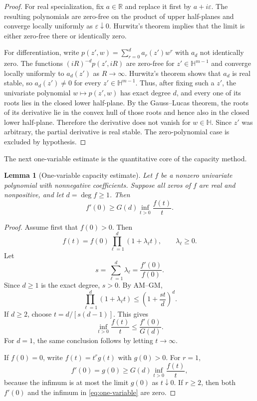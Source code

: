 \documentclass[11pt,a4paper]{article}
\numberwithin{equation}{section}
\newtheorem{lemma}[theorem]{Lemma}
\theoremstyle{definition}
\newcommand{\1}{\mathbf{1}}
\newcommand{\cH}{\mathbb{H}}
\newcommand{\eps}{\varepsilon}
\begin{document}
\begin{proof}
For real specialization, fix $a\in\mathbb R$ and replace it first by $a+i\eps$.  The resulting polynomials are zero-free on the product of upper half-planes and converge locally uniformly as $\eps\downarrow0$.  Hurwitz's theorem implies that the limit is either zero-free there or identically zero.

For differentiation, write $p(z',w)=\sum_{r=0}^d a_r(z')w^r$ with $a_d$ not identically zero.  The functions $(iR)^{-d}p(z',iR)$ are zero-free for $z'\in\cH^{m-1}$ and converge locally uniformly to $a_d(z')$ as $R\to\infty$.  Hurwitz's theorem shows that $a_d$ is real stable, so $a_d(z')\ne0$ for every $z'\in\cH^{m-1}$.  Thus, after fixing such a $z'$, the univariate polynomial $w\mapsto p(z',w)$ has exact degree $d$, and every one of its roots lies in the closed lower half-plane.  By the Gauss--Lucas theorem, the roots of its derivative lie in the convex hull of those roots and hence also in the closed lower half-plane.  Therefore the derivative does not vanish for $w\in\cH$.  Since $z'$ was arbitrary, the partial derivative is real stable.  The zero-polynomial case is excluded by hypothesis.
\end{proof}

The next one-variable estimate is the quantitative core of the capacity method.

\begin{lemma}[One-variable capacity estimate]\label{lem:one-variable}
Let $f$ be a nonzero univariate polynomial with nonnegative coefficients.  Suppose all zeros of $f$ are real and nonpositive, and let $d=\deg f\ge1$.  Then
\begin{equation}\label{eq:one-variable}
 f'(0)\ge G(d)\inf_{t>0}\frac{f(t)}t.
\end{equation}
\end{lemma}

\begin{proof}
Assume first that $f(0)>0$.  Then
\[
 f(t)=f(0)\prod_{\ell=1}^d(1+\lambda_\ell t),
 \qquad \lambda_\ell\ge0.
\]
Let
\[
 s=\sum_{\ell=1}^d\lambda_\ell=\frac{f'(0)}{f(0)}.
\]
Since $d\ge1$ is the exact degree, $s>0$.  By AM--GM,
\[
 \prod_{\ell=1}^d(1+\lambda_\ell t)
 \le \left(1+\frac{st}{d}\right)^d.
\]
If $d\ge2$, choose $t=d/[s(d-1)]$.  This gives
\[
 \inf_{t>0}\frac{f(t)}t
 \le \frac{f'(0)}{G(d)}.
\]
For $d=1$, the same conclusion follows by letting $t\to\infty$.

If $f(0)=0$, write $f(t)=t^r g(t)$ with $g(0)>0$.  For $r=1$,
\[
 f'(0)=g(0)\ge G(d)\inf_{t>0}\frac{f(t)}t,
\]
because the infimum is at most the limit $g(0)$ as $t\downarrow0$.  If $r\ge2$, then both $f'(0)$ and the infimum in \eqref{eq:one-variable} are zero.
\end{proof}
\end{document}
